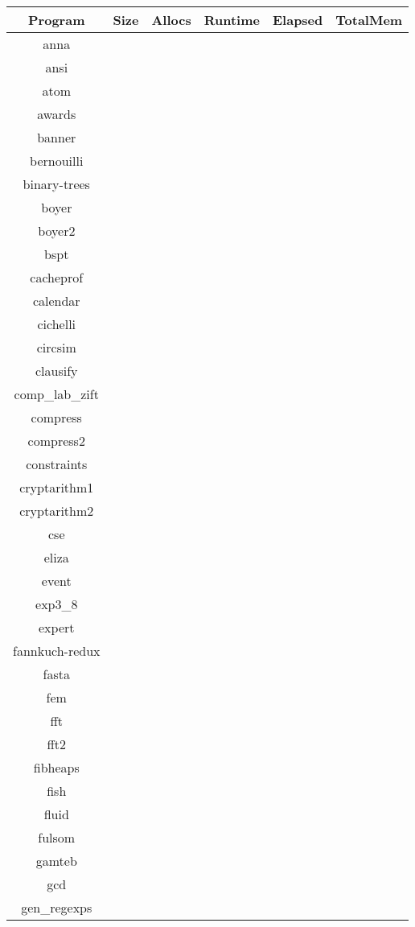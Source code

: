 \begin{tabular}{ c c c c c c }
Program & Size & Allocs & Runtime & Elapsed & TotalMem\\
\hline
anna &  &  &  &  & \\
ansi &  &  &  &  & \\
atom &  &  &  &  & \\
awards &  &  &  &  & \\
banner &  &  &  &  & \\
bernouilli &  &  &  &  & \\
binary-trees &  &  &  &  & \\
boyer &  &  &  &  & \\
boyer2 &  &  &  &  & \\
bspt &  &  &  &  & \\
cacheprof &  &  &  &  & \\
calendar &  &  &  &  & \\
cichelli &  &  &  &  & \\
circsim &  &  &  &  & \\
clausify &  &  &  &  & \\
comp\_lab\_zift &  &  &  &  & \\
compress &  &  &  &  & \\
compress2 &  &  &  &  & \\
constraints &  &  &  &  & \\
cryptarithm1 &  &  &  &  & \\
cryptarithm2 &  &  &  &  & \\
cse &  &  &  &  & \\
eliza &  &  &  &  & \\
event &  &  &  &  & \\
exp3\_8 &  &  &  &  & \\
expert &  &  &  &  & \\
fannkuch-redux &  &  &  &  & \\
fasta &  &  &  &  & \\
fem &  &  &  &  & \\
fft &  &  &  &  & \\
fft2 &  &  &  &  & \\
fibheaps &  &  &  &  & \\
fish &  &  &  &  & \\
fluid &  &  &  &  & \\
fulsom &  &  &  &  & \\
gamteb &  &  &  &  & \\
gcd &  &  &  &  & \\
gen\_regexps &  &  &  &  & \\

\end{tabular}

